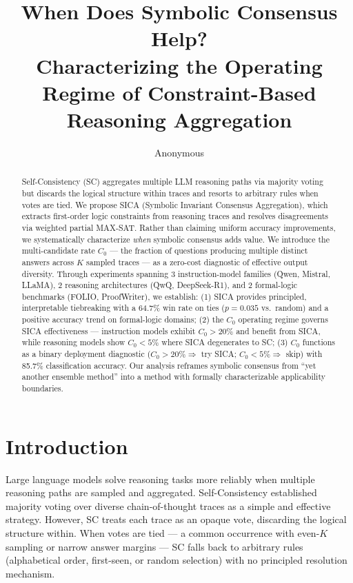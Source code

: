 \documentclass[11pt]{article}
\title{When Does Symbolic Consensus Help? \\ Characterizing the Operating Regime of Constraint-Based Reasoning Aggregation}
\author{Anonymous}
\date{}
\begin{document}
\maketitle

\begin{abstract}
Self-Consistency (SC) aggregates multiple LLM reasoning paths via majority voting but discards the logical structure within traces and resorts to arbitrary rules when votes are tied. We propose SICA (Symbolic Invariant Consensus Aggregation), which extracts first-order logic constraints from reasoning traces and resolves disagreements via weighted partial MAX-SAT. Rather than claiming uniform accuracy improvements, we systematically characterize \emph{when} symbolic consensus adds value. We introduce the multi-candidate rate $C_0$ --- the fraction of questions producing multiple distinct answers across $K$ sampled traces --- as a zero-cost diagnostic of effective output diversity. Through experiments spanning 3 instruction-model families (Qwen, Mistral, LLaMA), 2 reasoning architectures (QwQ, DeepSeek-R1), and 2 formal-logic benchmarks (FOLIO, ProofWriter), we establish: (1) SICA provides principled, interpretable tiebreaking with a 64.7\% win rate on ties ($p=0.035$ vs.\ random) and a positive accuracy trend on formal-logic domains; (2) the $C_0$ operating regime governs SICA effectiveness --- instruction models exhibit $C_0 > 20\%$ and benefit from SICA, while reasoning models show $C_0 < 5\%$ where SICA degenerates to SC; (3) $C_0$ functions as a binary deployment diagnostic ($C_0 > 20\% \Rightarrow$ try SICA; $C_0 < 5\% \Rightarrow$ skip) with 85.7\% classification accuracy. Our analysis reframes symbolic consensus from ``yet another ensemble method'' into a method with formally characterizable applicability boundaries.
\end{abstract}

\section{Introduction}

Large language models solve reasoning tasks more reliably when multiple reasoning paths are sampled and aggregated. Self-Consistency \cite{wang2023selfconsistency} established majority voting over diverse chain-of-thought traces as a simple and effective strategy. However, SC treats each trace as an opaque vote, discarding the logical structure within. When votes are tied --- a common occurrence with even-$K$ sampling or narrow answer margins --- SC falls back to arbitrary rules (alphabetical order, first-seen, or random selection) with no principled resolution mechanism.
\end{document}
